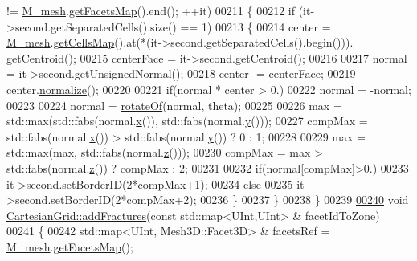 \begin{DoxyCode}
      != \hyperlink{classFVCode3D_1_1CartesianGrid_a40c64e663b3d2de02b852403c75495fb}{M\_mesh}.\hyperlink{classFVCode3D_1_1Mesh3D_a76de387da2a552e3e1210d795bc7acf9}{getFacetsMap}().end(); ++it)
00211     \{
00212         \textcolor{keywordflow}{if} (it->second.getSeparatedCells().size() == 1)
00213         \{
00214             center = \hyperlink{classFVCode3D_1_1CartesianGrid_a40c64e663b3d2de02b852403c75495fb}{M\_mesh}.\hyperlink{classFVCode3D_1_1Mesh3D_ad904ef5e068c89951d77e9364e960bf3}{getCellsMap}().at(*(it->second.getSeparatedCells().begin())).
      getCentroid();
00215             centerFace = it->second.getCentroid();
00216 
00217             normal = it->second.getUnsignedNormal();
00218             center -= centerFace;
00219             center.\hyperlink{classFVCode3D_1_1Point3D_a0d1cd3d114b0985ae2b11cd1c52de673}{normalize}();
00220 
00221             \textcolor{keywordflow}{if}(normal * center > 0.)
00222                 normal = -normal;
00223 
00224             normal = \hyperlink{namespaceFVCode3D_aefa056e4f7c5d10edd993b812dd670da}{rotateOf}(normal, theta);
00225 
00226             max = std::max(std::fabs(normal.\hyperlink{classFVCode3D_1_1Point3D_ae015d6aa31f8b304f69696bdcbd4da19}{x}()), std::fabs(normal.\hyperlink{classFVCode3D_1_1Point3D_a950abcabbf3bb32fc2daf64c28d77416}{y}()));
00227             compMax = std::fabs(normal.\hyperlink{classFVCode3D_1_1Point3D_ae015d6aa31f8b304f69696bdcbd4da19}{x}()) > std::fabs(normal.\hyperlink{classFVCode3D_1_1Point3D_a950abcabbf3bb32fc2daf64c28d77416}{y}()) ? 0 : 1;
00228 
00229             max = std::max(max, std::fabs(normal.\hyperlink{classFVCode3D_1_1Point3D_a865109e2006cc1de3681ab601081f5aa}{z}()));
00230             compMax = max > std::fabs(normal.\hyperlink{classFVCode3D_1_1Point3D_a865109e2006cc1de3681ab601081f5aa}{z}()) ? compMax : 2;
00231 
00232             \textcolor{keywordflow}{if}(normal[compMax]>0.)
00233                 it->second.setBorderID(2*compMax+1);
00234             \textcolor{keywordflow}{else}
00235                 it->second.setBorderID(2*compMax+2);
00236         \}
00237     \}
00238 \}
00239 
\hypertarget{CartesianGrid_8cpp_source.tex_l00240}{}\hyperlink{classFVCode3D_1_1CartesianGrid_ad331317a639d3441d6fa7707b78dfc67}{00240} \textcolor{keywordtype}{void} \hyperlink{classFVCode3D_1_1CartesianGrid_ad331317a639d3441d6fa7707b78dfc67}{CartesianGrid::addFractures}(\textcolor{keyword}{const} std::map<UInt,UInt> & facetIdToZone)
00241 \{
00242     std::map<UInt, Mesh3D::Facet3D> & facetsRef = \hyperlink{classFVCode3D_1_1CartesianGrid_a40c64e663b3d2de02b852403c75495fb}{M\_mesh}.\hyperlink{classFVCode3D_1_1Mesh3D_a76de387da2a552e3e1210d795bc7acf9}{getFacetsMap}();

\end{DoxyCode}
